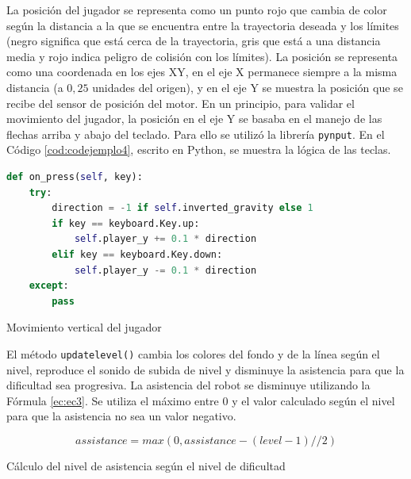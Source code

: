 La posición del jugador se representa como un punto rojo que cambia de color según la distancia a la que se encuentra entre la trayectoria deseada y los límites (negro significa que está cerca de la trayectoria, gris que está a una distancia media y rojo indica peligro de colisión con los límites).
La posición se representa como una coordenada en los ejes XY, en el eje X permanece siempre a la misma distancia (a $0,25$ unidades del origen), y en el eje Y se muestra la posición que se recibe del sensor de posición del motor.
En un principio, para validar el movimiento del jugador, la posición en el eje Y se basaba en el manejo de las flechas arriba y abajo del teclado.
Para ello se utilizó la librería \verb|pynput|.
En el Código \ref{cod:codejemplo4}, escrito en Python, se muestra la lógica de las teclas.

\begin{code}[h]
\begin{lstlisting}[language=Python]
def on_press(self, key):
	try:
		direction = -1 if self.inverted_gravity else 1
		if key == keyboard.Key.up:
			self.player_y += 0.1 * direction
		elif key == keyboard.Key.down:
			self.player_y -= 0.1 * direction
	except:
		pass
\end{lstlisting}
\caption[Movimiento vertical del jugador]{Movimiento vertical del jugador}
\label{cod:codejemplo4}
\end{code}

El método \verb|updatelevel()| cambia los colores del fondo y de la línea según el nivel, reproduce el sonido de subida de nivel y disminuye la asistencia para que la dificultad sea progresiva.
La asistencia del robot se disminuye utilizando la Fórmula \ref{ec:ec3}.
Se utiliza el máximo entre 0 y el valor calculado según el nivel para que la asistencia no sea un valor negativo.

\begin{myequation}[h]
\begin{equation}
assistance = max(0, assistance - (level - 1) // 2)
\nonumber
\label{ec:ec3}
\end{equation}
\caption[Cálculo del nivel de asistencia según el nivel de dificultad]{Cálculo del nivel de asistencia según el nivel de dificultad}
\end{myequation}

